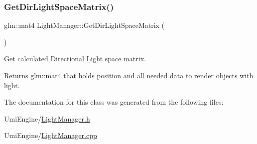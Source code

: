 \subsubsection{\texorpdfstring{GetDirLightSpaceMatrix()}{GetDirLightSpaceMatrix()}}
{\footnotesize\ttfamily glm\+::mat4 Light\+Manager\+::\+Get\+Dir\+Light\+Space\+Matrix (\begin{DoxyParamCaption}{ }\end{DoxyParamCaption})\hspace{0.3cm}{\ttfamily [static]}}



Get calculated Directional \mbox{\hyperlink{class_light}{Light}} space matrix. 

\begin{DoxyReturn}{Returns}
glm\+::mat4 that holds position and all needed data to render objects with light. 
\end{DoxyReturn}


The documentation for this class was generated from the following files\+:\begin{DoxyCompactItemize}
\item 
Umi\+Engine/\mbox{\hyperlink{_light_manager_8h}{Light\+Manager.\+h}}\item 
Umi\+Engine/\mbox{\hyperlink{_light_manager_8cpp}{Light\+Manager.\+cpp}}\end{DoxyCompactItemize}
